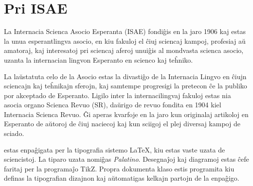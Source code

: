 \documentclass[full]{srevuo}
\begin{document}

\part*{Pri ISAE}
\bigskip
{
\small
La Internacia Scienca Asocio Esperanta (ISAE) fondiĝis en la jaro 1906
kaj estas la unua esperantlingva asocio, en kiu fakuloj el ĉiuj sciencaj
kampoj, profesiaj aŭ amatoraj, kaj interesatoj pri sciencaj aferoj unuiĝis al
mondvasta scienca asocio, uzanta la internacian lingvon Esperanto en scienco
kaj teĥniko.

La laŭstatuta celo de la Asocio estas la divastiĝo de la Internacia Lingvo en
ĉiujn sciencajn kaj teĥnikajn sferojn, kaj samtempe progresigi la pretecon ĉe
la publiko por akceptado de Esperanto.  Ligilo inter la internacilingvaj
fakuloj estas nia asocia organo Scienca Revuo (SR), daŭrigo de revuo fondita en
1904 kiel Internacia Scienca Revuo. Ĝi aperas kvarfoje en la jaro kun
originalaj artikoloj en Esperanto de aŭtoroj de ĉiuj naciecoj kaj kun sciigoj
el plej diversaj kampoj de sciado.
\par\bigskip\noindent
{}
\par\bigskip\noindent
\srevuo estas enpaĝigata per la tipografia sistemo \LaTeX, kiu
estas vaste uzata de sciencistoj. La tiparo uzata
nomiĝas \textit{Palatino}. Desegnaĵoj kaj diagramoj estas ĉefe
faritaj per la programaĵo TikZ. Propra dokumenta klaso estis
programita kiu definas la tipografian dizajnon kaj aŭtomatigas kelkajn
partojn de la enpaĝigo.
}
\end{document}
